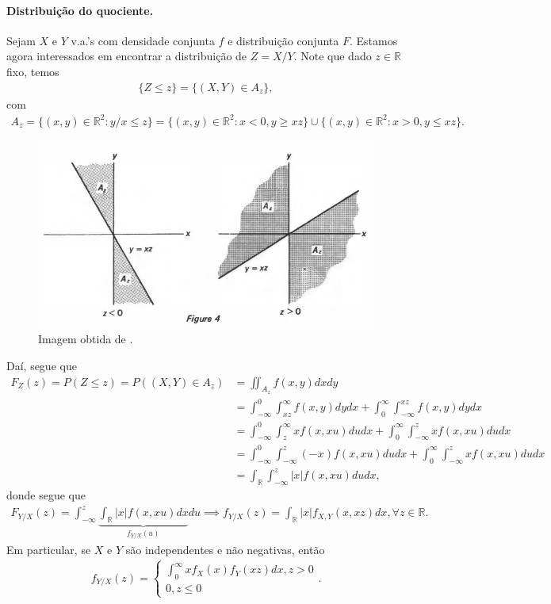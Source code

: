\documentclass[../Notas.tex]{subfiles}
\begin{document}
\paragraph{Distribuição do quociente.} Sejam $X$ e $Y$ v.a.'s com densidade conjunta $f$ e distribuição conjunta $F$. Estamos agora interessados em encontrar a distribuição de $Z=X/Y$. Note que dado $z\in\mathbb{R}$ fixo, temos
\begin{align*}
    \{Z\leq z\} = \{ (X,Y)\in A_z \},
\end{align*}
com
\begin{align*}
    A_z = \{ (x,y)\in\mathbb{R}^2 : y/x \leq z \} = \{ (x,y)\in\mathbb{R}^2 : x < 0, y\geq xz \} \cup \{ (x,y)\in\mathbb{R}^2 : x > 0, y\leq xz \}.
\end{align*}
\begin{figure}[H]
    \centering
    \includegraphics[width=\textwidth]{Imagens/quociente.png}
    \caption{Imagem obtida de \cite{Hoel}.}
\end{figure}

Daí, segue que
\begin{align*}
    F_Z(z) = P(Z\leq z) = P((X,Y)\in A_z) &= \iint_{A_z} f(x,y) dxdy \\
    &= \int_{-\infty}^{0}\int_{xz}^{\infty} f(x,y) dydx + \int_{0}^{\infty}\int_{-\infty}^{xz} f(x,y) dydx \\
    &= \int_{-\infty}^{0}\int_{z}^{\infty} xf(x,xu) dudx + \int_{0}^{\infty}\int_{-\infty}^{z} xf(x,xu) dudx \\
    &= \int_{-\infty}^{0}\int_{-\infty}^{z} (-x)f(x,xu) dudx + \int_{0}^{\infty}\int_{-\infty}^{z} xf(x,xu) dudx \\
    &= \int_{\mathbb{R}}\int_{-\infty}^{z} |x|f(x,xu) dudx,
\end{align*}
donde segue que
\begin{align*}
    F_{Y/X}(z) = \int_{-\infty}^z \underbrace{\int_{\mathbb{R}} |x|f(x,xu) dx}_{f_{Y/X}(u)}du \implies f_{Y/X}(z) = \int_{\mathbb{R}} |x|f_{X,Y}(x,xz) dx, \forall z\in\mathbb{R}.
\end{align*}
Em  particular, se $X$ e $Y$ são independentes e não negativas, então
\begin{align*}
    f_{Y/X}(z) = \begin{cases}
    \int_{0}^{\infty} xf_X(x)f_Y(xz) dx, z > 0 \\
    0, z\leq 0
    \end{cases}.
\end{align*}
\end{document}

